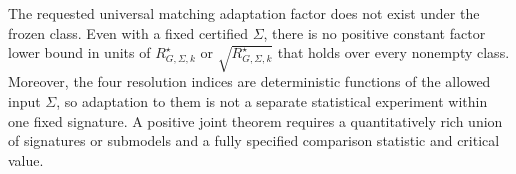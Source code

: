The requested universal matching adaptation factor does not exist under the frozen class. Even with a fixed certified \(\Sigma\), there is no positive constant factor lower bound in units of \(R_{G,\Sigma,k}^{\star}\) or \(\sqrt{R_{G,\Sigma,k}^{\star}}\) that holds over every nonempty class. Moreover, the four resolution indices are deterministic functions of the allowed input \(\Sigma\), so adaptation to them is not a separate statistical experiment within one fixed signature. A positive joint theorem requires a quantitatively rich union of signatures or submodels and a fully specified comparison statistic and critical value.